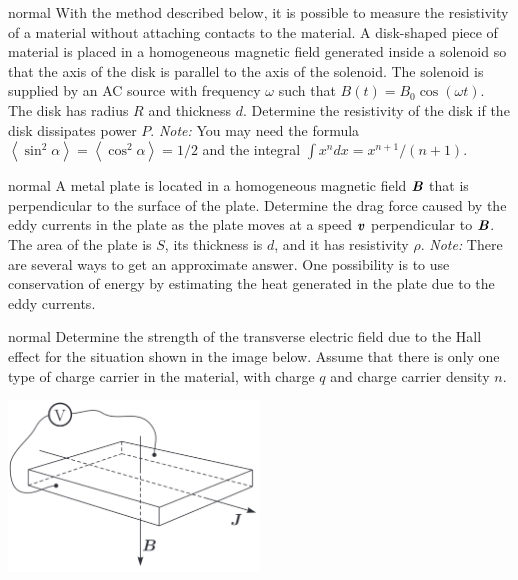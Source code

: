 \hypertarget{P170}{}
\begin{solution}{normal} %
With the method described below, it is possible to measure the resistivity of a material without attaching contacts to the material. A disk-shaped piece of material is placed in a homogeneous magnetic field generated inside a solenoid so that the axis of the disk is parallel to the axis of the solenoid. The solenoid is supplied by an AC source with frequency $\omega$ such that $B(t)=B_0\cos(\omega t)$. The disk has radius $R$ and thickness $d$. Determine the resistivity of the disk if the disk dissipates power $P$. \textit{Note:} You may need the formula $\left<\sin^2\alpha\right>=\left<\cos^2\alpha\right>=1/2$ and the integral $\int x^ndx=x^{n+1}/(n+1)$.
\end{solution}

\hypertarget{P171}{}
\begin{solution}{normal} %
A metal plate is located in a homogeneous magnetic field $\textbf{\textit{B}}$ that is perpendicular to the surface of the plate. Determine the drag force caused by the eddy currents in the plate as the plate moves at a speed $\textbf{\textit{v}}$ perpendicular to $\textbf{\textit{B}}$. The area of the plate is $S$, its thickness is $d$, and it has resistivity $\rho$. \textit{Note:} There are several ways to get an approximate answer. One possibility is to use conservation of energy by estimating the heat generated in the plate due to the eddy currents.
\end{solution}
\newpage
\hypertarget{P172}{}
\begin{solution}{normal} %
Determine the strength of the transverse electric field due to the Hall effect for the situation shown in the image below. Assume that there is only one type of charge carrier in the material, with charge $q$ and charge carrier density $n$.
\begin{center}
    \includegraphics[width=0.5\textwidth]{S7 Figures/S7-172.png}
\end{center}
\end{solution}

